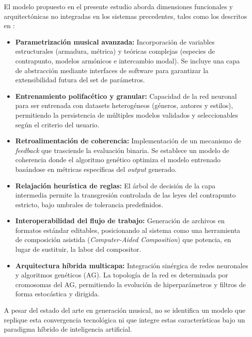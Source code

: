 \documentclass[12pt]{report}
\begin{document}
El modelo propuesto en el presente estudio aborda dimensiones funcionales y arquitectónicas no integradas en los sistemas precedentes, tales como los descritos en \cite{ji2020comprehensive}:

\begin{itemize}
    \item \textbf{Parametrización musical avanzada:} Incorporación de variables estructurales (armadura, métrica) y teóricas complejas (especies de contrapunto, modelos armónicos e intercambio modal). Se incluye una capa de abstracción mediante interfaces de software para garantizar la extensibilidad futura del set de parámetros.

    \item \textbf{Entrenamiento polifacético y granular:} Capacidad de la red neuronal para ser entrenada con datasets heterogéneos (géneros, autores y estilos), permitiendo la persistencia de múltiples modelos validados y seleccionables según el criterio del usuario.

    \item \textbf{Retroalimentación de coherencia:} Implementación de un mecanismo de \textit{feedback} que trasciende la evaluación binaria. Se establece un modelo de coherencia donde el algoritmo genético optimiza el modelo entrenado basándose en métricas específicas del \textit{output} generado.

    \item \textbf{Relajación heurística de reglas:} El árbol de decisión de la capa intermedia permite la transgresión controlada de las leyes del contrapunto estricto, bajo umbrales de tolerancia predefinidos.

    \item \textbf{Interoperabilidad del flujo de trabajo:} Generación de archivos en formatos estándar editables, posicionando al sistema como una herramienta de composición asistida (\textit{Computer-Aided Composition}) que potencia, en lugar de sustituir, la labor del compositor.

    \item \textbf{Arquitectura híbrida multicapa:} Integración sinérgica de redes neuronales y algoritmos genéticos (AG). La topología de la red es determinada por cromosomas del AG, permitiendo la evolución de hiperparámetros y filtros de forma estocástica y dirigida.
\end{itemize}

A pesar del estado del arte en generación musical, no se identifica un modelo que replique esta convergencia tecnológica ni que integre estas características bajo un paradigma híbrido de inteligencia artificial.
\end{document}
